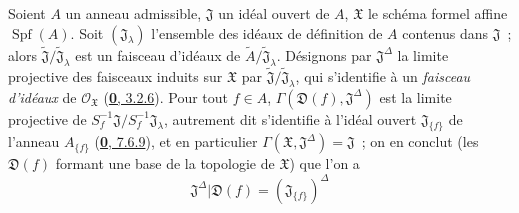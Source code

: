 \begin{env}[10.3.1]
\label{I.10.3.1-fr}
Soient $A$ un anneau admissible, $\mathfrak{J}$ un idéal ouvert de $A$,
$\mathfrak{X}$ le schéma formel affine $\operatorname{Spf}(A)$. Soit
$(\mathfrak{J}_\lambda)$ l'ensemble des idéaux de définition de $A$
contenus dans $\mathfrak{J}$~; alors
$\widetilde{\mathfrak{J}}/\widetilde{\mathfrak{J}}_\lambda$ est un
faisceau d'idéaux de
$\widetilde{A}/\widetilde{\mathfrak{J}}_\lambda$. Désignons par
$\mathfrak{J}^\Delta$ la limite projective des faisceaux induits sur
$\mathfrak{X}$ par
$\widetilde{\mathfrak{J}}/\widetilde{\mathfrak{J}}_\lambda$, qui
s'identifie à un \emph{faisceau d'idéaux} de
$\mathscr{O}_{\mathfrak{X}}$ (\hyperref[0.3.2.6-fr]{\textbf{0}, 3.2.6}). Pour tout
$f\in A$, $\Gamma(\mathfrak{D}(f),\mathfrak{J}^\Delta)$ est la limite
projective de
$S_f^{-1}\mathfrak{J}/S_f^{-1}\mathfrak{J}_\lambda$, autrement dit
s'identifie à l'idéal ouvert $\mathfrak{J}_{\{f\}}$ de l'anneau
$A_{\{f\}}$ (\hyperref[0.7.6.9-fr]{\textbf{0}, 7.6.9}), et en particulier
$\Gamma(\mathfrak{X},\mathfrak{J}^\Delta)=\mathfrak{J}$~; on en conclut
(les $\mathfrak{D}(f)$ formant une base de la topologie de $\mathfrak{X}$)
que l'on a
\[
  \mathfrak{J}^\Delta|\mathfrak{D}(f)
  =(\mathfrak{J}_{\{f\}})^\Delta
  \tag{10.3.1.1}\label{I.10.3.1.1-fr}
\]
\end{env}

